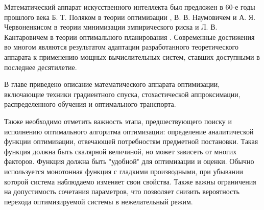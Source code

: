 Математический аппарат искусственного интеллекта был предложен в 60-е годы прошлого века
Б. Т. Поляком в теории оптимизации \cite{kantorovich1960mathematical}, 
В. В. Наумовичем и А. Я. Червоненкисом \cite{вапник1974теория} в теории минимизации эмпирического риска
и Л. В. Кантаровичем в теории оптимального планирования \cite{kantorovich1960mathematical}.
Современные достижения во многом являются результатом адаптации разработанного теоретического аппарата к применению 
мощных вычислительных систем, ставших доступными в последнее десятилетие.

В главе приведено описание математического аппарата оптимизации, включающие техники
градиентного спуска, стохастической аппроксимации, распределенного обучения и оптимального транспорта.

Также необходимо отметить важность этапа, предшествующего поиску и исполнению оптимального алгоритма оптимизации:
определение аналитической функции оптимизации, отвечающей потребностям предметной постановки. 
Такая функция должна быть скалярной величиной, но может зависеть от многих факторов. Функция должна быть "удобной" для 
оптимизации и оценки. Обычно используется монотонная функция с гладкими производными, при убывании которой 
система наблюдаемо изменяет свои свойства. Также важны ограничения на допустимость сочетания параметров, что 
позволяет снизить вероятность перехода оптимизируемой системы в нежелательный режим.
